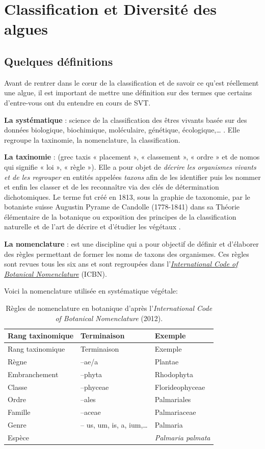 \documentclass[
]{book}
\begin{document}
\hypertarget{classification}{%
\chapter{Classification et Diversité des algues}\label{classification}}

\hypertarget{quelques-duxe9finitions}{%
\section{Quelques définitions}\label{quelques-duxe9finitions}}

Avant de rentrer dans le cœur de la classification et de savoir ce qu'est réellement une algue, il est important de mettre une définition sur des termes que certains d'entre-vous ont du entendre en cours de SVT.

\textbf{La systématique} : science de la classification des êtres vivants basée sur des données biologique, biochimique, moléculaire, génétique, écologique,\ldots{} . Elle regroupe la taxinomie, la nomenclature, la classification.

\textbf{La taxinomie} : (grec taxis « placement », « classement », « ordre » et de nomos qui signifie « loi », « règle »). Elle a pour objet de \emph{décrire les organismes vivants et de les regrouper} en entités appelées \emph{taxons} afin de les identifier puis les nommer et enfin les classer et de les reconnaître via des clés de détermination dichotomiques. Le terme fut créé en 1813, sous la graphie de taxonomie, par le botaniste suisse Augustin Pyrame de Candolle (1778-1841) dans sa Théorie élémentaire de la botanique ou exposition des principes de la classification naturelle et de l'art de décrire et d'étudier les végétaux \citep{de1844}.

\textbf{La nomenclature} : est une discipline qui a pour objectif de définir et d'élaborer des règles permettant de former les noms de taxons des organismes. Ces règles sont revues tous les six ans et sont regroupées dans l'\href{http://iapt-taxon.org/nomen/main.php}{\emph{International Code of Botanical Nomenclature}} (ICBN).

Voici la nomenclature utilisée en systématique végétale:

\begin{longtable}[]{@{}lll@{}}
\caption{Règles de nomenclature en botanique d'après l'\emph{International Code of Botanical Nomenclature} (2012).}\tabularnewline
\toprule
Rang taxinomique & Terminaison & Exemple\tabularnewline
\midrule
\endfirsthead
\toprule
Rang taxinomique & Terminaison & Exemple\tabularnewline
\midrule
\endhead
Règne & --ae/a & Plantae\tabularnewline
Embranchement & --phyta & Rhodophyta\tabularnewline
Classe & --phyceae & Florideophyceae\tabularnewline
Ordre & --ales & Palmariales\tabularnewline
Famille & --aceae & Palmariaceae\tabularnewline
Genre & -- us, um, is, a, ium,\ldots{} & Palmaria\tabularnewline
Espèce & & \emph{Palmaria palmata}\tabularnewline
\bottomrule
\end{longtable}
\end{document}

